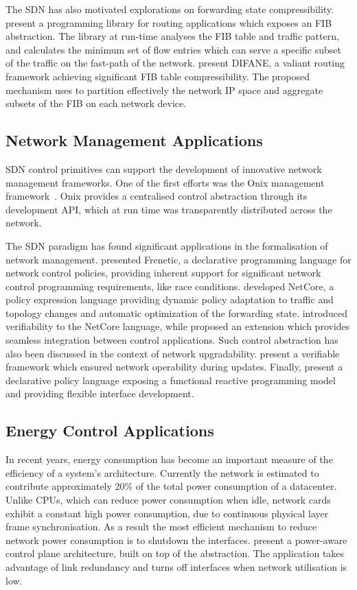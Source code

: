The SDN has also motivated explorations on forwarding state compressibility.
 present a programming library for routing applications 
which exposes an FIB abstraction.  The library at run-time analyses the FIB table and
traffic pattern, and calculates the minimum set of flow entries which can
serve a specific subset of the traffic on the fast-path of the network.
 present DIFANE, a valiant routing framework achieving significant
FIB table compressibility.  The proposed mechanism uses \of to
partition effectively the network IP space and aggregate subsets of the FIB on
each network device. 

\subsection{Network Management Applications}

SDN control primitives can support the development of innovative network
management frameworks. One of the first efforts was the Onix management
framework~. Onix provides a centralised control abstraction
through its development API, which at run time was transparently distributed
across the network. 

The SDN paradigm has found significant applications in the formalisation of 
network management.  presented Frenetic, a declarative
programming language for network control policies, providing inherent support for
significant network control programming requirements, like race conditions.
 developed NetCore, a policy expression language providing
dynamic policy adaptation to traffic and topology changes and automatic
optimization of the forwarding state.  introduced verifiability to
the NetCore language, while  proposed an extension which
provides seamless integration between control applications. Such control
abstraction has also been discussed in the context of network upgradability.
 present a verifiable framework which ensured network
operability during updates. Finally,  present a declarative
policy language exposing a functional reactive programming model  and providing
flexible interface development.

\subsection{Energy Control Applications}

In recent years, energy consumption has become an important measure of
the efficiency of a system's architecture. Currently the network is estimated to
contribute approximately 20\% of the total power consumption of a datacenter.
Unlike CPUs, which can reduce power consumption when idle, network cards exhibit
a constant high power consumption, due to continuous physical layer frame
synchronisation. As a result the most efficient mechanism to reduce network
power consumption is to shutdown the interfaces.   present a
power-aware control plane architecture, built on top of the \of abstraction. The
application takes advantage of link redundancy and turns off interfaces when
network utilisation is low. 

